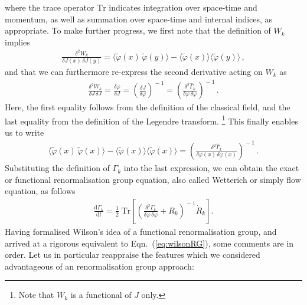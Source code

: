 \documentclass[11pt]{book}
\newcommand{\Tr}{\mathrm{Tr}}
\numberwithin{equation}{chapter}
\begin{document}
where the trace operator $\Tr$ indicates integration
over space-time and momentum, as well as summation over
space-time and internal indices, as appropriate.
To make further progress, we
first note that the definition of $W_k$ implies
\begin{align}
  \frac{ \delta^2 W_k }{ \delta J(x) \, \delta J(y) }
  =
  \big\langle \tilde \varphi (x) \, \tilde \varphi (y) \big\rangle
  - \big\langle \tilde \varphi (x) \big\rangle \big\langle \tilde \varphi (y) \big\rangle \,,
\end{align}
and that we can furthermore re-express the second derivative
acting on $W_k$ as
\begin{align}
  \frac{ \delta^2 W_k }{ \delta J \, \delta J }
  = \frac{ \delta \varphi }{ \delta J }
  = \left( \frac{ \delta J }{ \delta \varphi } \right) ^{\!\! -1}
  = \left( \frac{ \delta^2 \hat \Gamma_k }{ \delta \varphi \, \delta \varphi } \right) ^{\!\! -1} \,.
\end{align}
Here, the first equality follows from the definition of the classical field,
and the last equality from the definition of the Legendre transform.%
\footnote{%
  Note that $W_k$ is a functional of $J$ only.
}
This finally enables us to write
\begin{align}
  \big\langle \tilde \varphi (x) \, \tilde \varphi (x) \big\rangle
  - \big\langle \tilde \varphi (x) \big\rangle \big\langle \tilde \varphi (x) \big\rangle
  = \left( \frac{ \delta^2 \hat \Gamma_k }{ \delta \varphi(x) \, \delta \varphi(x) } \right) ^{\!\! -1} \,.
\end{align}
Substituting the definition of $\Gamma_k$ into the last expression,
we can obtain the exact or functional renormalisation group equation,
also called Wetterich or simply flow equation, as follows
\begin{align}
    \frac{ \mathrm d \Gamma_k }{ \mathrm dt }
    = \frac 12 \; \Tr
    \left[
      \left(
        \frac{ \delta^2 \Gamma_k }{ \delta \varphi \, \delta \varphi } + R_k
      \right) ^{\!\!-1}
      \! \dot R_k
    \right] .
\end{align}
Having formalised Wilson's idea of a functional renormalisation group,
and arrived at a rigorous equivalent to Eqn.~(\ref{eq:wilsonRG}),
some comments are in order. Let us in particular reappraise the
features which we considered advantageous of an renormalisation group approach:
\bigskip
\end{document}
